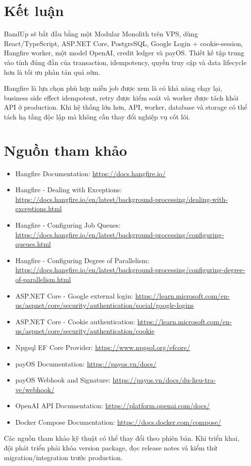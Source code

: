 \documentclass[11pt,a4paper]{article}
\begin{document}
\section{Kết luận}

BandUp sẽ bắt đầu bằng một Modular Monolith trên VPS, dùng React/TypeScript, ASP.NET Core, PostgreSQL, Google Login + cookie-session, Hangfire worker, một model OpenAI, credit ledger và payOS. Thiết kế tập trung vào tính đúng đắn của transaction, idempotency, quyền truy cập và data lifecycle hơn là tối ưu phân tán quá sớm.

Hangfire là lựa chọn phù hợp miễn job được xem là có khả năng chạy lại, business side effect idempotent, retry được kiểm soát và worker được tách khỏi API ở production. Khi hệ thống lớn hơn, API, worker, database và storage có thể tách hạ tầng độc lập mà không cần thay đổi nghiệp vụ cốt lõi.

\clearpage
\section*{Nguồn tham khảo}
\begin{itemize}
  \item Hangfire Documentation: \url{https://docs.hangfire.io/}
  \item Hangfire - Dealing with Exceptions: \url{https://docs.hangfire.io/en/latest/background-processing/dealing-with-exceptions.html}
  \item Hangfire - Configuring Job Queues: \url{https://docs.hangfire.io/en/latest/background-processing/configuring-queues.html}
  \item Hangfire - Configuring Degree of Parallelism: \url{https://docs.hangfire.io/en/latest/background-processing/configuring-degree-of-parallelism.html}
  \item ASP.NET Core - Google external login: \url{https://learn.microsoft.com/en-us/aspnet/core/security/authentication/social/google-logins}
  \item ASP.NET Core - Cookie authentication: \url{https://learn.microsoft.com/en-us/aspnet/core/security/authentication/cookie}
  \item Npgsql EF Core Provider: \url{https://www.npgsql.org/efcore/}
  \item payOS Documentation: \url{https://payos.vn/docs/}
  \item payOS Webhook and Signature: \url{https://payos.vn/docs/du-lieu-tra-ve/webhook/}
  \item OpenAI API Documentation: \url{https://platform.openai.com/docs/}
  \item Docker Compose Documentation: \url{https://docs.docker.com/compose/}
\end{itemize}

\begin{importantbox}
Các nguồn tham khảo kỹ thuật có thể thay đổi theo phiên bản. Khi triển khai, đội phát triển phải khóa version package, đọc release notes và kiểm thử migration/integration trước production.
\end{importantbox}
\end{document}

